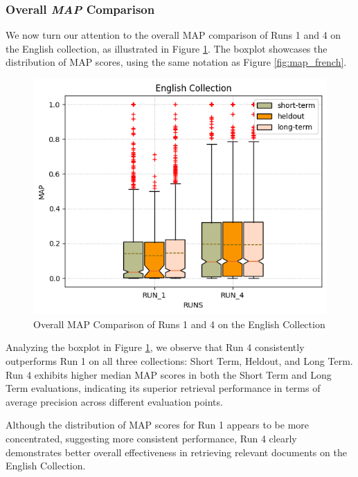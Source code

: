 \subsubsection{Overall \textit{MAP} Comparison} \label{sec:map_comparison_eng}

We now turn our attention to the overall \ac{MAP} comparison of Runs 1 and 4 on the English collection, as illustrated in Figure \ref{fig:map_english}. 
The boxplot showcases the distribution of \ac{MAP} scores, using the same notation as Figure \ref{fig:map_french}.

\begin{figure}[!h]
\centering
\includegraphics[width=\linewidth]{figure/StatisticalAnalysis/BoxPlot/MAP English.png}
\caption{Overall \ac{MAP} Comparison of Runs 1 and 4 on the English Collection}
\label{fig:map_english}
\end{figure}

Analyzing the boxplot in Figure \ref{fig:map_english}, we observe that Run 4 consistently outperforms Run 1 on all three collections: Short Term, Heldout, and Long Term. 
Run 4 exhibits higher median \ac{MAP} scores in both the Short Term and Long Term evaluations, indicating its superior retrieval performance in terms of average precision across different evaluation points.

Although the distribution of \ac{MAP} scores for Run 1 appears to be more concentrated, suggesting more consistent performance, Run 4 clearly demonstrates better overall effectiveness in retrieving relevant documents on the English Collection.

